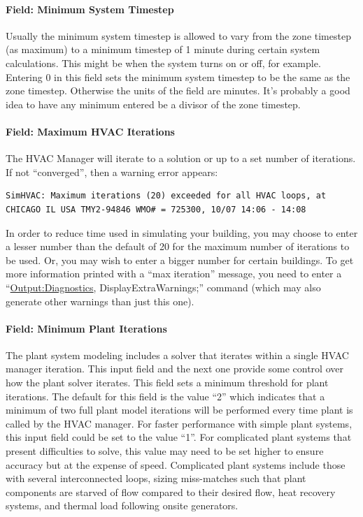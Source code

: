 \paragraph{Field: Minimum System Timestep}\label{field-minimum-system-timestep}

Usually the minimum system timestep is allowed to vary from the zone timestep (as maximum) to a minimum timestep of 1 minute during certain system calculations. This might be when the system turns on or off, for example. Entering 0 in this field sets the minimum system timestep to be the same as the zone timestep. Otherwise the units of the field are minutes. It's probably a good idea to have any minimum entered be a divisor of the zone timestep.

\paragraph{Field: Maximum HVAC Iterations}\label{field-maximum-hvac-iterations}

The HVAC Manager will iterate to a solution or up to a set number of iterations. If not ``converged'', then a warning error appears:

\begin{lstlisting}
SimHVAC: Maximum iterations (20) exceeded for all HVAC loops, at CHICAGO IL USA TMY2-94846 WMO# = 725300, 10/07 14:06 - 14:08
\end{lstlisting}

In order to reduce time used in simulating your building, you may choose to enter a lesser number than the default of 20 for the maximum number of iterations to be used. Or, you may wish to enter a bigger number for certain buildings. To get more information printed with a ``max iteration'' message, you need to enter a ``\hyperref[outputdiagnostics]{Output:Diagnostics}, DisplayExtraWarnings;'' command (which may also generate other warnings than just this one).

\paragraph{Field: Minimum Plant Iterations}\label{field-minimum-plant-iterations}

The plant system modeling includes a solver that iterates within a single HVAC manager iteration. This input field and the next one provide some control over how the plant solver iterates. This field sets a minimum threshold for plant iterations. The default for this field is the value ``2'' which indicates that a minimum of two full plant model iterations will be performed every time plant is called by the HVAC manager. For faster performance with simple plant systems, this input field could be set to the value ``1''. For complicated plant systems that present difficulties to solve, this value may need to be set higher to ensure accuracy but at the expense of speed. Complicated plant systems include those with several interconnected loops, sizing miss-matches such that plant components are starved of flow compared to their desired flow, heat recovery systems, and thermal load following onsite generators.

